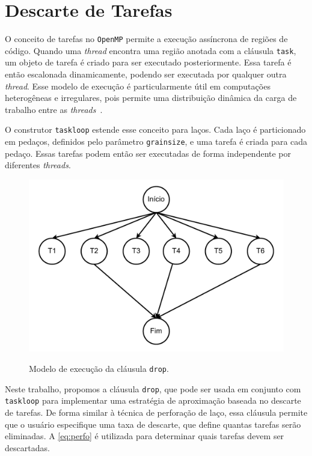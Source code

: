 \section{Descarte de Tarefas}\label{subsec:pragmaTaskdrop}

O conceito de tarefas no \texttt{OpenMP} permite a execução assíncrona de regiões de código. Quando uma \textit{thread} encontra uma região anotada com a cláusula \texttt{task}, um objeto de tarefa é criado para ser executado posteriormente. Essa tarefa é então escalonada dinamicamente, podendo ser executada por qualquer outra \textit{thread}. Esse modelo de execução é particularmente útil em computações heterogêneas e irregulares, pois permite uma distribuição dinâmica da carga de trabalho entre as \textit{threads}~\cite{ayguade2007,openmpapi52}.

O construtor \texttt{taskloop} estende esse conceito para laços. Cada laço é particionado em pedaços, definidos pelo parâmetro \texttt{grainsize}, e uma tarefa é criada para cada pedaço. Essas tarefas podem então ser executadas de forma independente por diferentes \textit{threads}.

\begin{figure}[htb]
    \caption{Modelo de execução da cláusula \texttt{drop}.}
    \centering
    \includegraphics[width=\textwidth]{figuras/task.pdf}
    \label{fig:task_drop}
    \fonte{}
\end{figure}

Neste trabalho, propomos a cláusula \texttt{drop}, que pode ser usada em conjunto com \texttt{taskloop} para implementar uma estratégia de aproximação baseada no descarte de tarefas. De forma similar à técnica de perforação de laço, essa cláusula permite que o usuário especifique uma taxa de descarte, que define quantas tarefas serão eliminadas. A \autoref{eq:perfo} é utilizada para determinar quais tarefas devem ser descartadas.

